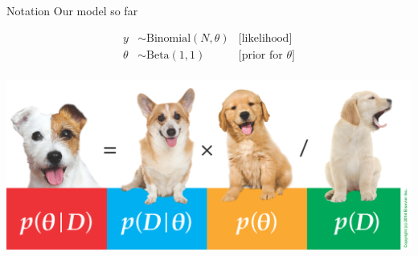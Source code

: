 \documentclass[
  ignorenonframetext,
  aspectratio=169]{beamer}
\begin{document}
\begin{frame}{Notation}
\protect\hypertarget{notation}{}
Our model so far

\begin{align*}
   y &\sim \text{Binomial}(N, \theta) &\text{[likelihood]}
   \\
  \theta &\sim \text{Beta}(1, 1) &\text{[prior for }\theta \text{]} \\ 
\end{align*}
\end{frame}

\begin{frame}
\includegraphics{img/bayes_puppies.png}
\end{frame}
\end{document}
